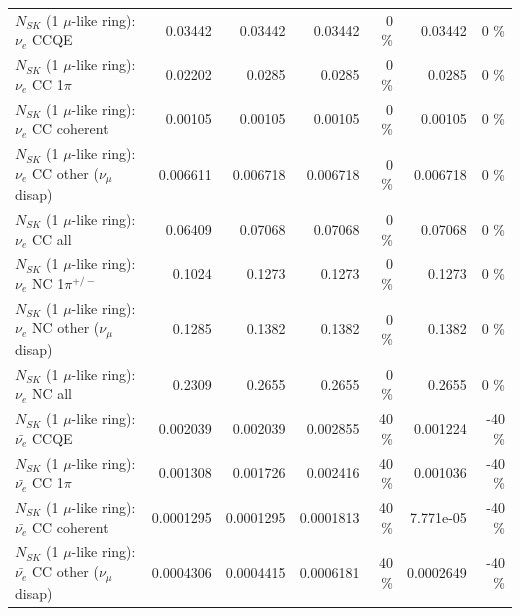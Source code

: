 \begin{table}
\begin{tabular}{| l | r | r | r  r | r  r |}
\hline
\hline
\hline
                                      $N_{SK}$ (1 $\mu$-like ring): $\nu_e$ CCQE &         0.03442 &         0.03442 &         0.03442 &        0 \%  &         0.03442 &        0 \%  \\ 
                                 $N_{SK}$ (1 $\mu$-like ring): $\nu_e$ CC 1$\pi$ &         0.02202 &          0.0285 &          0.0285 &        0 \%  &          0.0285 &        0 \%  \\ 
                               $N_{SK}$ (1 $\mu$-like ring): $\nu_e$ CC coherent &         0.00105 &         0.00105 &         0.00105 &        0 \%  &         0.00105 &        0 \%  \\ 
                $N_{SK}$ (1 $\mu$-like ring): $\nu_e$ CC other ($\nu_\mu$ disap) &        0.006611 &        0.006718 &        0.006718 &        0 \%  &        0.006718 &        0 \%  \\ 
                                  $N_{SK}$ (1 $\mu$-like ring): $\nu_{e}$ CC all &         0.06409 &         0.07068 &         0.07068 &        0 \%  &         0.07068 &        0 \%  \\ 
\hline
                           $N_{SK}$ (1 $\mu$-like ring): $\nu_e$ NC 1$\pi^{+/-}$ &          0.1024 &          0.1273 &          0.1273 &        0 \%  &          0.1273 &        0 \%  \\ 
                $N_{SK}$ (1 $\mu$-like ring): $\nu_e$ NC other ($\nu_\mu$ disap) &          0.1285 &          0.1382 &          0.1382 &        0 \%  &          0.1382 &        0 \%  \\ 
                                  $N_{SK}$ (1 $\mu$-like ring): $\nu_{e}$ NC all &          0.2309 &          0.2655 &          0.2655 &        0 \%  &          0.2655 &        0 \%  \\ 
\hline
\hline
\hline
                                $N_{SK}$ (1 $\mu$-like ring): $\bar{\nu_e}$ CCQE &        0.002039 &        0.002039 &        0.002855 &       40 \%  &        0.001224 &      -40 \%  \\ 
                           $N_{SK}$ (1 $\mu$-like ring): $\bar{\nu_e}$ CC 1$\pi$ &        0.001308 &        0.001726 &        0.002416 &       40 \%  &        0.001036 &      -40 \%  \\ 
                         $N_{SK}$ (1 $\mu$-like ring): $\bar{\nu_e}$ CC coherent &       0.0001295 &       0.0001295 &       0.0001813 &       40 \%  &       7.771e-05 &      -40 \%  \\ 
          $N_{SK}$ (1 $\mu$-like ring): $\bar{\nu_e}$ CC other ($\nu_\mu$ disap) &       0.0004306 &       0.0004415 &       0.0006181 &       40 \%  &       0.0002649 &      -40 \%  \\ 

\end{tabular}
\end{table}
